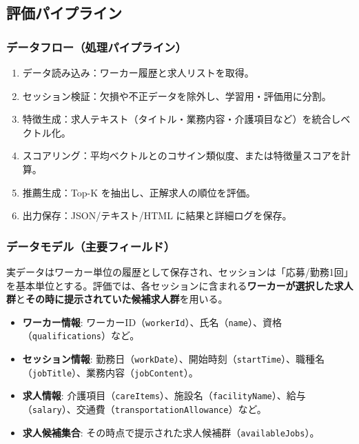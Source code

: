 \subsection{評価パイプライン}
\subsubsection*{データフロー（処理パイプライン）}
\begin{enumerate}
	\item データ読み込み：ワーカー履歴と求人リストを取得。
	\item セッション検証：欠損や不正データを除外し、学習用・評価用に分割。
	\item 特徴生成：求人テキスト（タイトル・業務内容・介護項目など）を統合しベクトル化。
	\item スコアリング：平均ベクトルとのコサイン類似度、または特徴量スコアを計算。
	\item 推薦生成：Top-K を抽出し、正解求人の順位を評価。
	\item 出力保存：JSON/テキスト/HTML に結果と詳細ログを保存。
\end{enumerate}

\subsubsection*{データモデル（主要フィールド）}
実データはワーカー単位の履歴として保存され、セッションは「応募/勤務1回」を基本単位とする。評価では、各セッションに含まれる\textbf{ワーカーが選択した求人群}と\textbf{その時に提示されていた候補求人群}を用いる。
\begin{itemize}
\item \textbf{ワーカー情報}: ワーカーID（\texttt{workerId}）、氏名（\texttt{name}）、資格（\texttt{qualifications}）など。
\item \textbf{セッション情報}: 勤務日（\texttt{workDate}）、開始時刻（\texttt{startTime}）、職種名（\texttt{jobTitle}）、業務内容（\texttt{jobContent}）。
\item \textbf{求人情報}: 介護項目（\texttt{careItems}）、施設名（\texttt{facilityName}）、給与（\texttt{salary}）、交通費（\texttt{transportationAllowance}）など。
\item \textbf{求人候補集合}: その時点で提示された求人候補群（\texttt{availableJobs}）。
\end{itemize}


